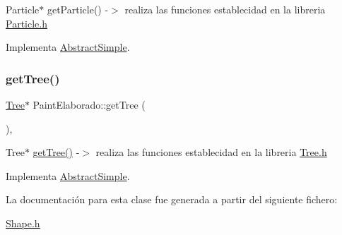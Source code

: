 Particle$\ast$ get\+Particle() -\/$>$ realiza las funciones establecidad en la libreria \mbox{\hyperlink{_particle_8h}{Particle.\+h}} 

Implementa \mbox{\hyperlink{class_abstract_simple}{Abstract\+Simple}}.

\mbox{\label{class_paint_elaborado_abaa86a2ff7ea9200eef2e000e1ee9bc7}} 
\subsubsection{\texorpdfstring{getTree()}{getTree()}}
{\footnotesize\ttfamily \mbox{\hyperlink{class_tree}{Tree}}$\ast$ Paint\+Elaborado\+::get\+Tree (\begin{DoxyParamCaption}{ }\end{DoxyParamCaption})\hspace{0.3cm}{\ttfamily [inline]}, {\ttfamily [virtual]}}

Tree$\ast$ \mbox{\hyperlink{class_paint_elaborado_abaa86a2ff7ea9200eef2e000e1ee9bc7}{get\+Tree()}} -\/$>$ realiza las funciones establecidad en la libreria \mbox{\hyperlink{_tree_8h}{Tree.\+h}} 

Implementa \mbox{\hyperlink{class_abstract_simple_ad90f5d7d3415a29af8bbf10ad8d89772}{Abstract\+Simple}}.



La documentación para esta clase fue generada a partir del siguiente fichero\+:\begin{DoxyCompactItemize}
\item 
\mbox{\hyperlink{_shape_8h}{Shape.\+h}}\end{DoxyCompactItemize}
